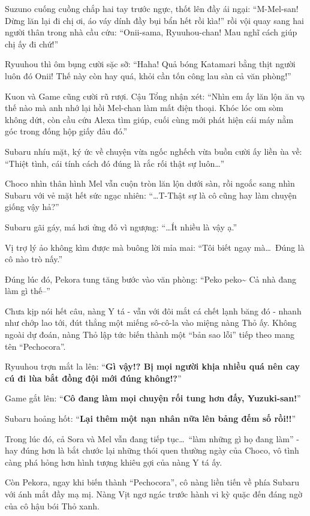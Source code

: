 \documentclass[../main.tex]{subfiles}
\begin{document}
Suzuno cuống cuồng chắp hai tay trước ngực, thốt lên đầy ái ngại: ``M-Mel-san! Dừng lăn lại đi chị ơi, áo váy dính đầy bụi bẩn hết rồi kìa!'' rồi vội quay sang hai người thân trong nhà cầu cứu: ``Onii-sama, Ryuuhou-chan! Mau nghĩ cách giúp chị ấy đi chứ!''

Ryuuhou thì ôm bụng cười sặc sỡ: ``Haha! Quả bóng Katamari bằng thịt người luôn đó Onii! Thế này còn hay quá, khỏi cần tốn công lau sàn cả văn phòng!''

Kuon và Game cũng cười rũ rượi. Cậu Tổng nhận xét: ``Nhìn em ấy lăn lộn ăn vạ thế nào mà anh nhớ lại hồi Mel-chan làm mất điện thoại. Khóc lóc om sòm không dứt, còn cầu cứu Alexa tìm giúp, cuối cùng mới phát hiện cái máy nằm góc trong đống hộp giấy đâu đó.''

Subaru nhíu mặt, ký ức về chuyện vừa ngốc nghếch vừa buồn cười ấy liền ùa về: ``Thiệt tình, cái tính cách đó đúng là rắc rối thật sự luôn\dots''

Choco nhìn thân hình Mel vẫn cuộn tròn lăn lộn dưới sàn, rồi ngoắc sang nhìn Subaru với vẻ mặt hết sức ngạc nhiên: ``\dots T-Thật sự là cô cũng hay làm chuyện giống vậy hả?''

Subaru gãi gáy, má hơi ửng đỏ vì ngượng: ``\dots Ít nhiều là vậy ạ.''

Vị trợ lý ảo không kìm được mà buông lời mỉa mai: ``Tôi biết ngay mà\dots\ Đúng là cô nào trò nấy.''

Đúng lúc đó, Pekora tung tăng bước vào văn phòng: ``Peko peko\~{} Cả nhà đang làm gì thế--''

Chưa kịp nói hết câu, nàng Y tá - vẫn với đôi mắt cá chết lạnh băng đó - nhanh như chớp lao tới, đút thẳng một miếng sô-cô-la vào miệng nàng Thỏ ấy. Không ngoài dự đoán, nàng Thỏ lập tức biến thành một ``bản sao lỗi'' tiếp theo mang tên ``Pechocora''.

Ryuuhou trợn mắt la lên: ``\textbf{Gì vậy!? Bị mọi người khịa nhiều quá nên cay cú đi lùa bắt đồng đội mới đúng không!?}''

Game gắt lên: ``\textbf{Cô đang làm mọi chuyện rối tung hơn đấy, Yuzuki-san!}''

Subaru hoảng hốt: ``\textbf{Lại thêm một nạn nhân nữa lên bảng đếm số rồi!!}''

Trong lúc đó, cả Sora và Mel vẫn đang tiếp tục\dots\ ``làm những gì họ đang làm'' - hay đúng hơn là bắt chước lại những thói quen thường ngày của Choco, vô tình càng phá hỏng hơn hình tượng khiêu gợi của nàng Y tá ấy.

Còn Pekora, ngay khi biến thành ``Pechocora'', cô nàng liền tiến về phía Subaru với ánh mắt đầy mạ mị. Nàng Vịt ngơ ngác trước hành vi kỳ quặc đến đáng ngờ của cô hậu bói Thỏ xanh.
\end{document}
